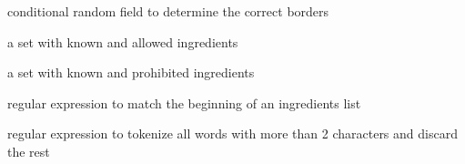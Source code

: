 \documentclass[letterpaper,10pt,english]{sphinxmanual}
\begin{document}
\begin{fulllineitems}
\begin{fulllineitems}
\end{fulllineitems}


\begin{fulllineitems}
\label{\detokenize{api:ingredient_extractor.IngredientExtractor.crf}}
conditional random field to determine the correct borders

\end{fulllineitems}


\begin{fulllineitems}
\label{\detokenize{api:ingredient_extractor.IngredientExtractor.whitelist}}
a set with known and allowed ingredients

\end{fulllineitems}


\begin{fulllineitems}
\label{\detokenize{api:ingredient_extractor.IngredientExtractor.blacklist}}
a set with known and prohibited ingredients

\end{fulllineitems}


\begin{fulllineitems}
\label{\detokenize{api:ingredient_extractor.IngredientExtractor.zutaten_pat}}
regular expression to match the beginning of an
ingredients list

\end{fulllineitems}


\begin{fulllineitems}
\label{\detokenize{api:ingredient_extractor.IngredientExtractor.token_pattern_just_words}}
regular expression to tokenize all
words with more than 2 characters and discard the rest


\end{fulllineitems}
\end{fulllineitems}
\end{document}
